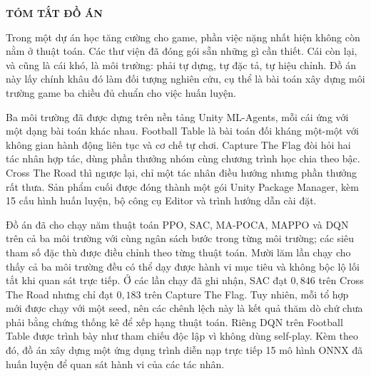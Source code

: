 \fontsize{13pt}{22.5pt}\selectfont
\begin{center}
    {\large\bfseries TÓM TẮT ĐỒ ÁN}
\end{center}

\vspace{0.5cm}

\indent Trong một dự án học tăng cường cho game, phần việc nặng nhất hiện không còn nằm ở
thuật toán. Các thư viện đã đóng gói sẵn những gì cần thiết. Cái còn lại, và cũng là cái
khó, là môi trường: phải tự dựng, tự đặc tả, tự hiệu chỉnh. Đồ án này lấy chính khâu đó
làm đối tượng nghiên cứu, cụ thể là bài toán xây dựng môi trường game ba chiều đủ chuẩn
cho việc huấn luyện.

\indent Ba môi trường đã được dựng trên nền tảng Unity ML-Agents, mỗi cái ứng với một
dạng bài toán khác nhau. Football Table là bài toán đối kháng một-một với không gian hành
động liên tục và cơ chế tự chơi. Capture The Flag đòi hỏi hai tác nhân hợp tác, dùng phần
thưởng nhóm cùng chương trình học chia theo bậc. Cross The Road thì ngược lại, chỉ một tác
nhân điều hướng nhưng phần thưởng rất thưa. Sản phẩm cuối được đóng thành một gói
Unity Package Manager, kèm 15 cấu hình huấn luyện, bộ công cụ Editor và trình hướng dẫn
cài đặt.

\indent Đồ án đã cho chạy năm thuật toán PPO, SAC, MA-POCA, MAPPO và DQN trên cả ba
môi trường với cùng ngân sách bước trong từng môi trường; các siêu tham số đặc thù được
điều chỉnh theo từng thuật toán. Mười lăm lần chạy cho thấy cả ba môi trường đều có thể
dạy được hành vi mục tiêu và không bộc lộ lối tắt khi quan sát trực tiếp. Ở các lần chạy
đã ghi nhận, SAC đạt $0{,}846$ trên Cross The Road nhưng chỉ đạt $0{,}183$ trên Capture
The Flag. Tuy nhiên, mỗi tổ hợp mới được chạy với một seed, nên các chênh lệch này là kết
quả thăm dò chứ chưa phải bằng chứng thống kê để xếp hạng thuật toán. Riêng DQN trên
Football Table được trình bày như tham chiếu độc lập vì không dùng self-play. Kèm theo đó,
đồ án xây dựng một ứng dụng trình diễn nạp trực tiếp 15 mô hình ONNX đã huấn luyện để quan
sát hành vi của các tác nhân.

